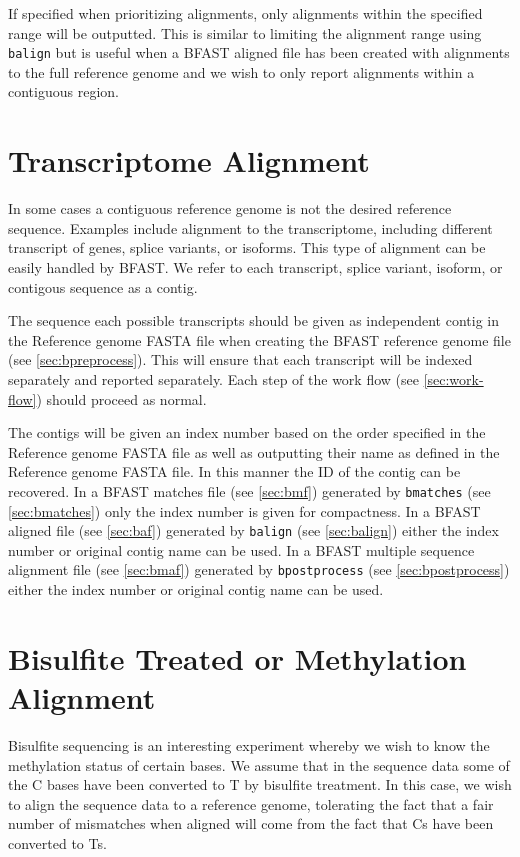 \documentclass[a4paper,12pt]{book}
\newcommand{\TT}[1]{{\tt #1}} %
\newcommand{\RGFF}{Reference genome FASTA file}
\newcommand{\BRGF}{BFAST reference genome file} %
\newcommand{\BMF}{BFAST matches file} %
\newcommand{\BAF}{BFAST aligned file} %
\newcommand{\BMAF}{BFAST multiple sequence alignment file} %
\begin{document}
If specified when prioritizing alignments, only alignments within the specified range will be outputted.
This is similar to limiting the alignment range using \TT{balign} but is useful when a \BAF{} has been created with alignments to the full reference genome and we wish to only report alignments within a contiguous region.

\section{Transcriptome Alignment}
\label{sec:transcriptome}
In some cases a contiguous reference genome is not the desired reference sequence.
Examples include alignment to the transcriptome, including different transcript of genes, splice variants, or isoforms.
This type of alignment can be easily handled by BFAST.
We refer to each transcript, splice variant, isoform, or contigous sequence as a contig.

The sequence each possible transcripts should be given as independent contig in the \RGFF{} when creating the \BRGF{} (see \autoref{sec:bpreprocess}).
This will ensure that each transcript will be indexed separately and reported separately.
Each step of the work flow (see \autoref{sec:work-flow}) should proceed as normal.

The contigs will be given an index number based on the order specified in the \RGFF{} as well as outputting their name as defined in the \RGFF{}.
In this manner the ID of the contig can be recovered.
In a \BMF{} (see \autoref{sec:bmf}) generated by \TT{bmatches} (see \autoref{sec:bmatches}) only the index number is given for compactness.
In a \BAF{} (see \autoref{sec:baf}) generated by \TT{balign} (see \autoref{sec:balign}) either the index number or original contig name can be used.
In a \BMAF{} (see \autoref{sec:bmaf}) generated by \TT{bpostprocess} (see \autoref{sec:bpostprocess}) either the index number or original contig name can be used.

\section{Bisulfite Treated or Methylation Alignment}
Bisulfite sequencing is an interesting experiment whereby we wish to know the methylation status of certain bases.
We assume that in the sequence data some of the C bases have been converted to T by bisulfite treatment.
In this case, we wish to align the sequence data to a reference genome, tolerating the fact that a fair number of mismatches when aligned will come from the fact that Cs have been converted to Ts.
\end{document}
